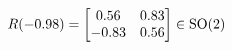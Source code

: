 \documentclass[preview]{standalone}
\begin{document}
\begin{align*}
\special{dvisvgm:raw <g id='unique000'>}R(-0.98) = \begin{bmatrix} 0.56 & 0.83 \\ -0.83 & 0.56 \end{bmatrix} \in \text{SO}(2)\special{dvisvgm:raw </g>}
\end{align*}
\end{document}
